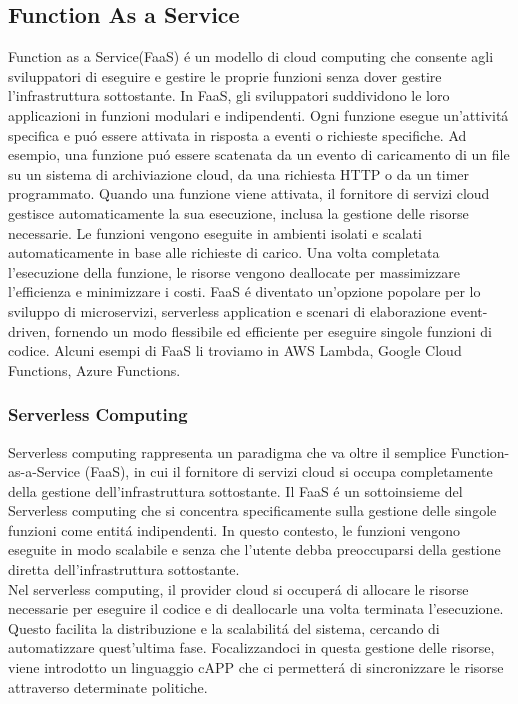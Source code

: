 \documentclass[../../main.tex]{subfiles}
\begin{document}
\subsection{Function As a  Service}
Function as a Service(FaaS) é un modello di cloud computing che consente agli sviluppatori di eseguire e gestire le proprie funzioni senza dover gestire l'infrastruttura sottostante.
In FaaS, gli sviluppatori suddividono le loro applicazioni in funzioni modulari e indipendenti. Ogni funzione esegue un'attivitá specifica e puó essere attivata in risposta a eventi o richieste specifiche. Ad esempio, una funzione puó essere scatenata da un evento di caricamento di un file su un sistema di archiviazione cloud, da una richiesta HTTP o da un timer programmato. Quando una funzione viene attivata, il fornitore di servizi cloud gestisce automaticamente la sua esecuzione, inclusa la gestione delle risorse necessarie. Le funzioni vengono eseguite in ambienti isolati e scalati automaticamente in base alle richieste di carico. Una volta completata l'esecuzione della funzione, le risorse vengono deallocate per massimizzare l'efficienza e minimizzare i costi.
FaaS é diventato un'opzione popolare per lo sviluppo di microservizi, serverless application e scenari di elaborazione event-driven, fornendo un modo flessibile ed efficiente per eseguire singole funzioni di codice.
Alcuni esempi di FaaS li troviamo in AWS Lambda, Google Cloud Functions, Azure Functions.

\subsubsection{Serverless Computing}
Serverless computing rappresenta un paradigma che va oltre il semplice Function-as-a-Service (FaaS), in cui il fornitore di servizi cloud si occupa completamente della gestione dell'infrastruttura sottostante. Il FaaS é un sottoinsieme del Serverless computing che si concentra specificamente sulla gestione delle singole funzioni come entitá indipendenti. In questo contesto, le funzioni vengono eseguite in modo scalabile e senza che l'utente debba preoccuparsi della gestione diretta dell'infrastruttura sottostante.\autocite{amslaurea24930}\\
Nel serverless computing, il provider cloud si occuperá di allocare le risorse necessarie per eseguire il codice e di deallocarle una volta terminata l'esecuzione. Questo facilita la distribuzione e la scalabilitá del sistema, cercando di automatizzare quest'ultima fase.
Focalizzandoci in questa gestione delle risorse, viene introdotto un linguaggio cAPP che ci permetterá di sincronizzare le risorse attraverso determinate politiche.
\newpage
\end{document}
